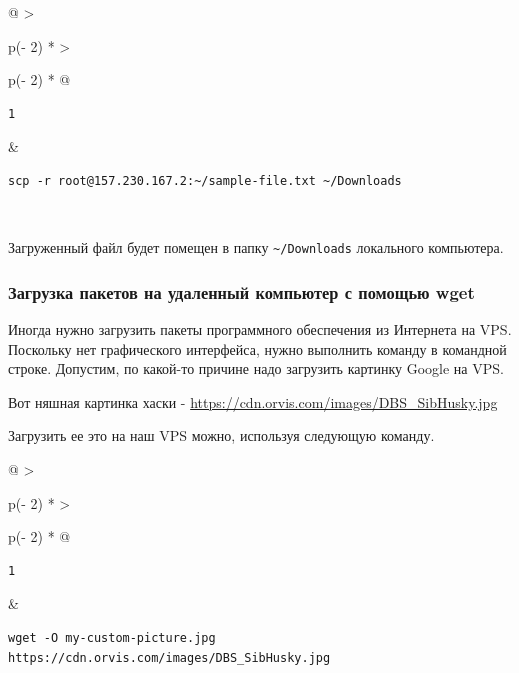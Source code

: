 \documentclass{article}
\begin{document}
\begin{longtable}[]{@{}
  >{\raggedright\arraybackslash}p{(\columnwidth - 2\tabcolsep) * }
  >{\raggedright\arraybackslash}p{(\columnwidth - 2\tabcolsep) * }@{}}
\toprule
\endhead
\begin{minipage}[t]{\linewidth}\raggedright
\begin{verbatim}
1
\end{verbatim}
\end{minipage} & \begin{minipage}[t]{\linewidth}\raggedright
\begin{verbatim}
scp -r root@157.230.167.2:~/sample-file.txt ~/Downloads
\end{verbatim}
\end{minipage} \\ \addlinespace
\bottomrule
\end{longtable}

Загруженный файл будет помещен в папку
\texttt{\textasciitilde{}/Downloads} локального компьютера.

\hypertarget{Downloading-packages-to-your-remote-machine-with-wget}{%
\subsubsection{\texorpdfstring{\protect\hyperlink{Downloading-packages-to-your-remote-machine-with-wget}{}Загрузка
пакетов на удаленный компьютер с помощью
wget}{Загрузка пакетов на удаленный компьютер с помощью wget}}\label{Downloading-packages-to-your-remote-machine-with-wget}}

Иногда нужно загрузить пакеты программного обеспечения из Интернета на
VPS. Поскольку нет графического интерфейса, нужно выполнить команду в
командной строке. Допустим, по какой-то причине надо загрузить картинку
Google на VPS.

Вот няшная картинка хаски -
\url{https://cdn.orvis.com/images/DBS_SibHusky.jpg}

Загрузить ее это на наш VPS можно, используя следующую команду.

\begin{longtable}[]{@{}
  >{\raggedright\arraybackslash}p{(\columnwidth - 2\tabcolsep) * }
  >{\raggedright\arraybackslash}p{(\columnwidth - 2\tabcolsep) * }@{}}
\toprule
\endhead
\begin{minipage}[t]{\linewidth}\raggedright
\begin{verbatim}
1
\end{verbatim}
\end{minipage} & \begin{minipage}[t]{\linewidth}\raggedright
\begin{verbatim}
wget -O my-custom-picture.jpg https://cdn.orvis.com/images/DBS_SibHusky.jpg
\end{verbatim}
\end{minipage} \\ \addlinespace
\bottomrule
\end{longtable}
\end{document}
